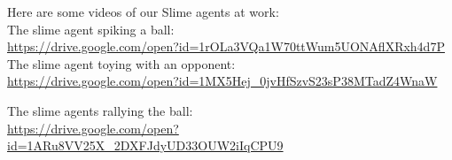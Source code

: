 \documentclass[10pt,twocolumn,letterpaper]{article}
\begin{document}
Here are some videos of our Slime agents at work: \\

The slime agent spiking a ball: \\
\url{https://drive.google.com/open?id=1rOLa3VQa1W70ttWum5UONAflXRxh4d7P} \\

The slime agent toying with an opponent: \\
\url{https://drive.google.com/open?id=1MX5Hej_0jvHfSzvS23sP38MTadZ4WnaW}

The slime agents rallying the ball: \\
\url{https://drive.google.com/open?id=1ARu8VV25X_2DXFJdyUD33OUW2iIqCPU9} \\


{\small


}
\end{document}
